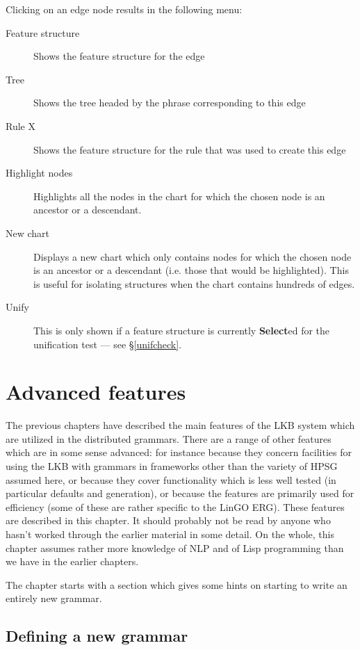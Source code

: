 \documentclass[12pt]{report}
\begin{document}
Clicking on an edge node results in the following menu:
\begin{description}
\item[Feature structure] Shows the feature structure for the
edge
\item[Tree] Shows the tree headed by the phrase corresponding to
this edge
\item[Rule X]  Shows the feature structure for the rule that was used
to create this edge
\item[Highlight nodes] Highlights all the nodes
in the chart for which the chosen node is an ancestor or a descendant.
\item[New chart] Displays a new chart which only contains nodes
for which the chosen node is an ancestor or a descendant (i.e. those that
would be highlighted).  This is useful for isolating structures
when the chart contains
hundreds of edges.
\item[Unify] This is only shown if a feature structure
is currently {\bf Select}ed for the unification test --- see 
\S\ref{unifcheck}.
\end{description}

\chapter{Advanced features}
\label{advanced}

The previous chapters have described the main features of the LKB 
system which are utilized in the distributed grammars.
There are a range of other features which are in some sense
advanced: for instance because they concern facilities for using the
LKB with grammars in frameworks other than
the variety of HPSG assumed here, 
or because they cover functionality which is less well
tested (in particular defaults and generation), or because 
the features are primarily used for efficiency (some of these are
rather specific to the LinGO ERG).
These features are described in this chapter.
It should probably not be read by anyone who hasn't worked through
the earlier material in some detail.
On the whole, this chapter assumes rather more knowledge of 
NLP and of Lisp programming than we have in the earlier chapters.

The chapter starts with a section which gives some hints on 
starting to write an entirely new grammar.

\section{Defining a new grammar}
\label{own}
\end{document}

